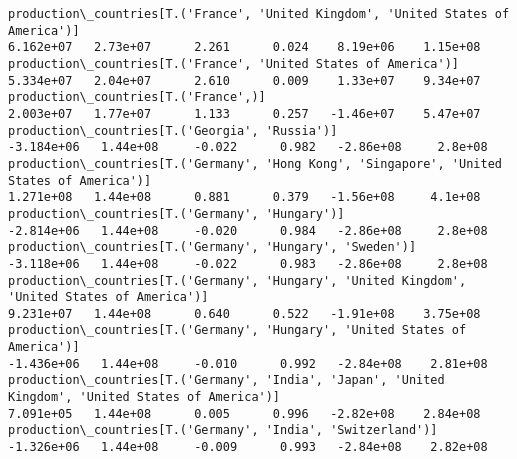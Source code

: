 \documentclass[11pt]{article}
\begin{document}
\begin{Verbatim}[commandchars=\\\{\}]
production\_countries[T.('France', 'United Kingdom', 'United States of America')]                                                                                                       6.162e+07   2.73e+07      2.261      0.024    8.19e+06    1.15e+08
production\_countries[T.('France', 'United States of America')]                                                                                                                         5.334e+07   2.04e+07      2.610      0.009    1.33e+07    9.34e+07
production\_countries[T.('France',)]                                                                                                                                                    2.003e+07   1.77e+07      1.133      0.257   -1.46e+07    5.47e+07
production\_countries[T.('Georgia', 'Russia')]                                                                                                                                         -3.184e+06   1.44e+08     -0.022      0.982   -2.86e+08     2.8e+08
production\_countries[T.('Germany', 'Hong Kong', 'Singapore', 'United States of America')]                                                                                              1.271e+08   1.44e+08      0.881      0.379   -1.56e+08     4.1e+08
production\_countries[T.('Germany', 'Hungary')]                                                                                                                                        -2.814e+06   1.44e+08     -0.020      0.984   -2.86e+08     2.8e+08
production\_countries[T.('Germany', 'Hungary', 'Sweden')]                                                                                                                              -3.118e+06   1.44e+08     -0.022      0.983   -2.86e+08     2.8e+08
production\_countries[T.('Germany', 'Hungary', 'United Kingdom', 'United States of America')]                                                                                           9.231e+07   1.44e+08      0.640      0.522   -1.91e+08    3.75e+08
production\_countries[T.('Germany', 'Hungary', 'United States of America')]                                                                                                            -1.436e+06   1.44e+08     -0.010      0.992   -2.84e+08    2.81e+08
production\_countries[T.('Germany', 'India', 'Japan', 'United Kingdom', 'United States of America')]                                                                                    7.091e+05   1.44e+08      0.005      0.996   -2.82e+08    2.84e+08
production\_countries[T.('Germany', 'India', 'Switzerland')]                                                                                                                           -1.326e+06   1.44e+08     -0.009      0.993   -2.84e+08    2.82e+08

\end{Verbatim}
\end{document}
